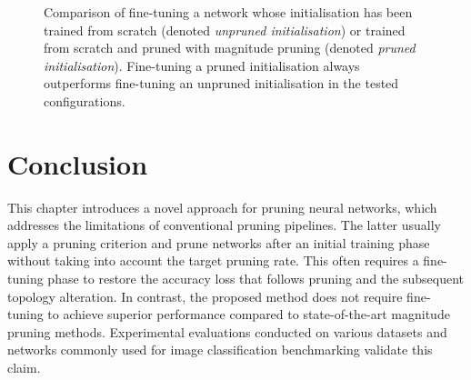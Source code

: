 \begin{figure}
  \caption{ Comparison of fine-tuning a network whose initialisation has been
    trained from scratch (denoted \emph{unpruned initialisation}) or trained from
    scratch and pruned with magnitude pruning (denoted \emph{pruned
      initialisation}). Fine-tuning a pruned initialisation always outperforms
    fine-tuning an unpruned initialisation in the tested configurations.}
  \label{fig:chap1:finetuning_with_init_not_pruned}

\end{figure}




\section{Conclusion}
\label{sec:chap1:conclusion}


This chapter introduces a novel approach for pruning neural networks, which
addresses the limitations of conventional pruning pipelines. The latter usually
apply a pruning criterion and prune networks after an initial training phase
without taking into account the target pruning rate. This often requires a
fine-tuning phase to restore the accuracy loss that follows pruning and the
subsequent topology alteration. In contrast, the proposed method does not
require fine-tuning to achieve superior performance compared to state-of-the-art
magnitude pruning methods. Experimental evaluations conducted on various
datasets and networks commonly used for image classification benchmarking
validate this claim.\\

